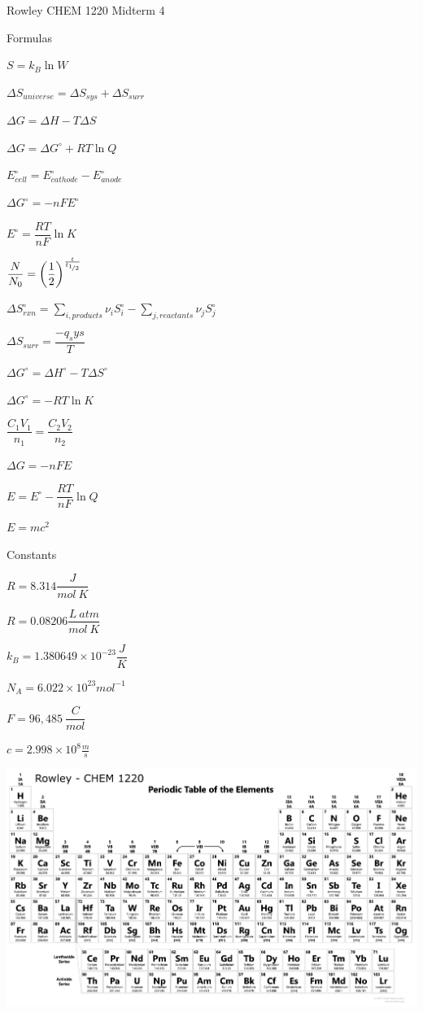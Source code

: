 \documentclass[12pt, letterpaper]{memoir}
\begin{document}
	\pagestyle{empty}
	\begin{center}
		{\Huge Rowley CHEM 1220 Midterm 4}
	\end{center}

	{\large Formulas}

	\begin{minipage}{0.5\linewidth}
		$S=k_B\ln W$

    $\Delta S_{universe} = \Delta S_{sys} + \Delta S_{surr}$

    $\Delta G = \Delta H - T\Delta S$

    $\Delta G = \Delta G^{\circ} + RT\ln Q$

    $E^\circ_{cell}=E^\circ_{cathode}-E^\circ_{anode}$

    $\Delta G^\circ = -nFE^\circ$

    $E^\circ = \dfrac{RT}{nF}\ln K$

    $\dfrac{N}{N_0}=\left(\dfrac{1}{2}\right)^{\frac{t}{t_{\nicefrac{1}{2}}}}$

	\end{minipage}
	\begin{minipage}{0.5\linewidth}
		$\displaystyle\Delta S^{\circ}_{rxn} = \sum\limits_{i, products} \nu_iS_i^{\circ} - \sum_{j, reactants} \nu_jS_j^{\circ}$

    $\Delta S_{surr} = \dfrac{-q_sys}{T}$

    $\Delta G^\circ = \Delta H^\circ - T\Delta S^\circ$

    $\Delta G^{\circ} = -RT\ln K$

    $\dfrac{C_1V_1}{n_1}=\dfrac{C_2V_2}{n_2}$

    $\Delta G=-nFE$

    $E = E^\circ - \dfrac{RT}{nF}\ln Q$

    $E=mc^2$
	\end{minipage}

	\vspace{2em}

	{\large Constants}

	$R=8.314 \dfrac{J}{mol~K}$

	$R=0.08206 \dfrac{L~atm}{mol~K}$

	$k_B=1.380649 \times 10^{-23} \dfrac{J}{K}$

	$N_A=6.022\times10^{23}mol^{-1}$

  $F=96,485~\dfrac{C}{mol}$

  $c=2.998\times10^8\frac{m}{s}$



\hspace{6em}	\includegraphics[width=1.3\textwidth, angle =90]{UpdatedTable.png}

	\restoregeometry
\end{document}
